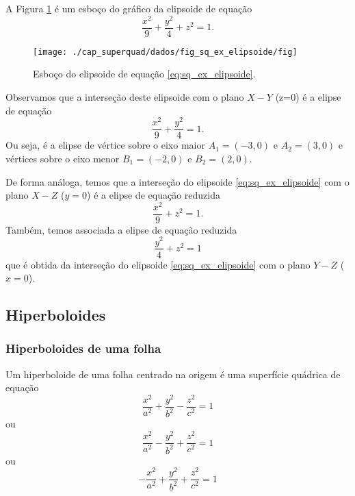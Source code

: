 \begin{ex}
  A Figura \ref{fig:sq_ex_elipsoide} é um esboço do gráfico da elipsoide de equação
  \begin{equation}\label{eq:sq_ex_elipsoide}
    \frac{x^2}{9} + \frac{y^2}{4} + z^2=1.
  \end{equation}
  
  \begin{figure}[H]
    \centering
    \texttt{[image: ./cap\_superquad/dados/fig\_sq\_ex\_elipsoide/fig]}
    \caption{Esboço do elipsoide de equação \eqref{eq:sq_ex_elipsoide}.}
    \label{fig:sq_ex_elipsoide}
  \end{figure}

  Observamos que a interseção deste elipsoide com o plano $X-Y$ (z=0) é a elipse de equação
  \begin{equation}
    \frac{x^2}{9}+\frac{y^2}{4}=1.
  \end{equation}
  Ou seja, é a elipse de vértice sobre o eixo maior $A_1=(-3,0)$ e $A_2=(3,0)$ e vértices sobre o eixo menor $B_1=(-2,0)$ e $B_2=(2,0)$.

  De forma análoga, temos que a interseção do elipsoide \eqref{eq:sq_ex_elipsoide} com o plano $X-Z$ ($y=0$) é a elipse de equação reduzida
  \begin{equation}
    \frac{x^2}{9} + z^2 = 1.
  \end{equation}
  Também, temos associada a elipse de equação reduzida
  \begin{equation}
    \frac{y^2}{4}+z^2=1
  \end{equation}
  que é obtida da interseção do elipsoide \eqref{eq:sq_ex_elipsoide} com o plano $Y-Z$ ($x=0$).  
\end{ex}

\subsection{Hiperboloides}

\subsubsection{Hiperboloides de uma folha}

Um hiperboloide de uma folha centrado na origem é uma superfície quádrica de equação
\begin{equation}
  \frac{x^2}{a^2}+\frac{y^2}{b^2}-\frac{z^2}{c^2}=1
\end{equation}
ou
\begin{equation}
  \frac{x^2}{a^2}-\frac{y^2}{b^2}+\frac{z^2}{c^2}=1
\end{equation}
ou
\begin{equation}
  -\frac{x^2}{a^2}+\frac{y^2}{b^2}+\frac{z^2}{c^2}=1
\end{equation}

